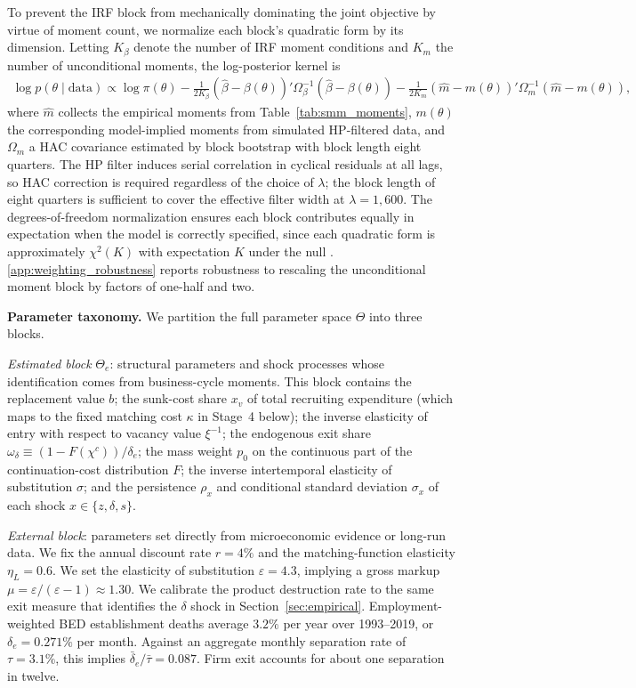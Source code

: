 \documentclass[authoryear, review, 12pt]{elsarticle}
\begin{document}
	To prevent the IRF block from mechanically dominating the joint objective by
	virtue of moment count, we normalize each block's quadratic form by its
	dimension. Letting $K_\beta$ denote the number of IRF moment conditions and
	$K_m$ the number of unconditional moments, the log-posterior kernel is
	\begin{align}\label{eq:posterior}
		\log p(\theta \mid \mathrm{data})
		\propto \log\pi(\theta)
		- \frac{1}{2K_\beta}(\hat\beta - \beta(\theta))'\Omega_\beta^{-1}
		(\hat\beta - \beta(\theta))
		- \frac{1}{2K_m}(\hat m - m(\theta))'\Omega_m^{-1}(\hat m - m(\theta)),
	\end{align}
	where $\hat m$ collects the empirical moments from Table~\ref{tab:smm_moments},
	$m(\theta)$ the corresponding model-implied moments from simulated HP-filtered
	data, and $\Omega_m$ a HAC covariance estimated by block bootstrap with block
	length eight quarters.  The HP filter induces serial correlation in cyclical
	residuals at all lags, so HAC correction is required regardless of the choice
	of $\lambda$; the block length of eight quarters is sufficient to cover the
	effective filter width at $\lambda=1{,}600$. The degrees-of-freedom normalization ensures each block
	contributes equally in expectation when the model is correctly specified, since
	each quadratic form is approximately $\chi^2(K)$ with expectation $K$ under the
	null \citep{dridi_2007}. \ref{app:weighting_robustness} reports
	robustness to rescaling the unconditional moment block by factors of one-half and
	two.

	\medskip\noindent\textbf{Parameter taxonomy.}
	We partition the full parameter space $\Theta$ into three blocks.
	
	\emph{Estimated block} $\Theta_e$: structural parameters and shock processes
	whose identification comes from business-cycle moments. This block contains the
	replacement value $b$; the sunk-cost share $x_v$ of total recruiting expenditure
	(which maps to the fixed matching cost $\kappa$ in Stage~4 below); the inverse
	elasticity of entry with respect to vacancy value $\xi^{-1}$; the endogenous
	exit share $\omega_\delta \equiv (1-F(\chi^c))/\delta_e$; the mass weight $p_0$ on
	the continuous part of the continuation-cost distribution $F$; the inverse
	intertemporal elasticity of substitution $\sigma$; and the persistence
	$\rho_x$ and conditional standard deviation $\sigma_x$ of each shock
	$x\in\{z,\delta,s\}$.
	
	\emph{External block}: parameters set directly from microeconomic evidence or
	long-run data. We fix the annual discount rate $r=4\%$ and the matching-function
	elasticity $\eta_L=0.6$. We set the elasticity of substitution
	$\varepsilon=4.3$, implying a gross markup
	$\mu=\varepsilon/(\varepsilon-1)\approx1.30$. We calibrate the product
	destruction rate to the same exit measure that identifies the $\delta$ shock in
	Section~\ref{sec:empirical}. Employment-weighted BED establishment deaths
	average $3.2\%$ per year over 1993--2019, or $\delta_e=0.271\%$ per month.
	Against an aggregate monthly separation rate of $\tau=3.1\%$, this implies
	$\bar\delta_e/\bar\tau=0.087$. Firm exit accounts for about one separation in
	twelve.
\end{document}
